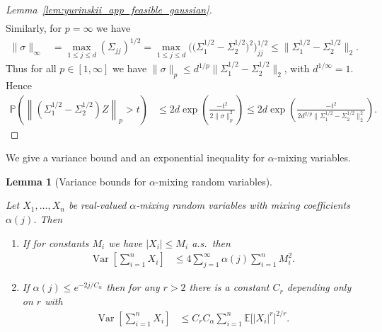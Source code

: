 \documentclass[11pt,lof]{puthesis}
\renewcommand{\P}{\ensuremath{\mathbb{P}}}
\newcommand{\E}{\ensuremath{\mathbb{E}}}
\DeclareMathOperator{\Var}{Var}
\theoremstyle{break}
\newtheorem{lemma}{Lemma}[section]
\theoremstyle{proof}
\newtheorem{proof}{Proof}
\begin{document}
\begin{proof}[Lemma~\ref{lem:yurinskii_app_feasible_gaussian}]
\begin{align*}
  \end{align*}
  Similarly, for $p = \infty$ we have
  \begin{align*}
    \|\sigma\|_\infty
    &=
    \max_{1 \leq j \leq d}
    (\Sigma_{j j})^{1/2}
    =
    \max_{1 \leq j \leq d}
    \Big(\big(\Sigma_1^{1/2} - \Sigma_2^{1/2}\big)^2\Big)_{j j}^{1/2}
    \leq
    \big\|\Sigma_1^{1/2} - \Sigma_2^{1/2}\big\|_2.
  \end{align*}
  Thus for all $p \in [1, \infty]$ we have
  $\|\sigma\|_p \leq
  d^{1/p} \big\|\Sigma_1^{1/2} - \Sigma_2^{1/2}\big\|_2$,
  with $d^{1/\infty} = 1$. Hence
  \begin{align*}
    \P\left(
      \left\|
        \left(\Sigma_1^{1/2} - \Sigma_2^{1/2}\right) Z
      \right\|_p
      > t
    \right)
    &\leq
    2 d \exp \left( \frac{-t^2}{2 \|\sigma\|_p^2} \right)
    \leq
    2 d \exp \left(
      \frac{-t^2}
      {2 d^{2/p} \big\|\Sigma_1^{1/2} - \Sigma_2^{1/2}\big\|_2^2}
    \right).
  \end{align*}
\end{proof}

We give a variance bound and an exponential inequality for $\alpha$-mixing
variables.

\begin{lemma}[Variance bounds for
  \texorpdfstring{$\alpha$}{alpha}-mixing random variables]
  \label{lem:yurinskii_app_variance_mixing}

  Let $X_1, \ldots, X_n$ be
  real-valued $\alpha$-mixing random
  variables with mixing coefficients $\alpha(j)$.
  Then
  \begin{enumerate}[label=(\roman*)]

    \item
      \label{it:yurinskii_app_variance_mixing_bounded}
      If for constants $M_i$ we have
      $|X_i| \leq M_i$ a.s.\ then
      \begin{align*}
        \Var\left[
          \sum_{i=1}^n X_i
        \right]
        &\leq
        4 \sum_{j=1}^\infty \alpha(j)
        \sum_{i=1}^n M_i^2.
      \end{align*}

    \item
      \label{it:yurinskii_app_variance_mixing_exponential}
      If $\alpha(j) \leq e^{-2j / C_\alpha}$ then
      for any $r>2$ there is a constant
      $C_r$ depending only on $r$ with
      \begin{align*}
        \Var\left[
          \sum_{i=1}^n X_i
        \right]
        &\leq
        C_r C_\alpha
        \sum_{i=1}^n
        \E\big[|X_i|^r\big]^{2/r}.
      \end{align*}
  \end{enumerate}
\end{lemma}
\end{document}
